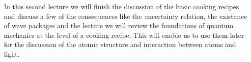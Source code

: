 In this second lecture we will finish the discussion of the basic cooking recipes and discuss a few of the consequences like the uncertainty relation, the existance of wave packages and the  lecture we will review the foundations of quantum mechanics at the level of a cooking recipe. This will enable us to use them later for the discussion of the atomic structure and interaction between atoms and light.
